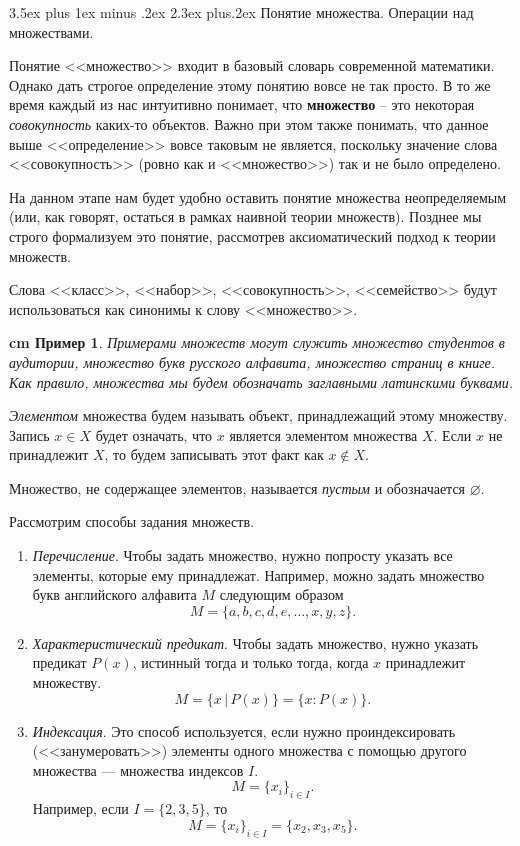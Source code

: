 \documentclass[12pt, russian]{article}
\makeatletter
\renewcommand\subsection{\@startsection {subsection}{2}{\parindent}%
{3.5ex plus 1ex minus .2ex}%
{2.3ex plus.2ex}%
{\normalfont\large\bfseries}}
\newtheorem{example}{\hskip 0.5 cm Пример}%
\makeatother
\begin{document}
\subsection{Понятие множества. Операции над множествами.}

Понятие <<множество>> входит в базовый словарь современной математики. Однако дать строгое определение этому понятию вовсе не так просто. В то же время каждый из нас интуитивно понимает, что \textbf{множество} -- это некоторая \textit{совокупность} каких-то объектов. Важно при этом также понимать, что данное выше <<определение>> вовсе таковым не является, поскольку значение слова <<совокупность>> (ровно как и <<множество>>) так и не было определено.

На данном этапе нам будет удобно оставить понятие множества неопределяемым (или, как говорят, остаться в рамках наивной теории множеств). Позднее мы строго формализуем это понятие, рассмотрев аксиоматический подход к теории множеств.

Слова <<класс>>, <<набор>>, <<совокупность>>, <<семейство>> будут использоваться как синонимы к слову <<множество>>.

\begin{example}
	Примерами множеств могут служить множество студентов в аудитории,  множество букв русского алфавита, множество страниц в книге. Как правило, множества мы будем обозначать заглавными латинскими буквами.
\end{example}

\textit{Элементом} множества будем называть объект, принадлежащий этому множеству. Запись $x \in X$ будет означать, что $x$ является элементом множества $X$. Если $x$ не принадлежит $X$, то будем записывать этот факт как $x \notin X$.

Множество, не содержащее элементов, называется \textit{пустым} и обозначается $\varnothing$.

Рассмотрим способы задания множеств.

\begin{enumerate}
	\item \textit{Перечисление}. Чтобы задать множество, нужно попросту указать все элементы, которые ему принадлежат. Например, можно задать множество букв английского алфавита $M$ следующим образом
	$$
	M = \{ a, b, c, d, e, \ldots, x, y, z \}.
	$$

	\item \textit{Характеристический предикат}. Чтобы задать множество, нужно указать предикат $P(x)$, истинный тогда и только тогда, когда $x$ принадлежит множеству.
	$$
	M = \{ x \, | \,  P(x)\} = \{ x: P(x)\}.
	$$

	\item \textit{Индексация}. Это способ используется, если нужно проиндексировать (<<занумеровать>>) элементы одного множества с помощью другого множества --- множества индексов $I$. 
	$$
	M = \{ x_i \}_{i \in I}.
	$$
	Например, если $I=\{2,3,5\}$, то
	$$
	M = \{ x_i \}_{i \in I} = \{ x_2, x_3, x_5 \}.
	$$
\end{enumerate}
\end{document}
